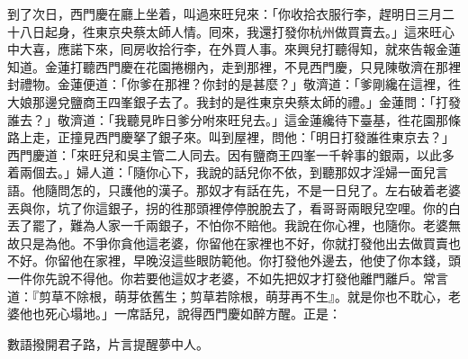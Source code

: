 到了次日，西門慶在廳上坐着，叫過來旺兒來：「你收拾衣服行李，趕明日三月二十八日起身，徃東京央蔡太師人情。囘來，我還打發你杭州做買賣去。」這來旺心中大喜，{}應諾下來，囘房收拾行李，在外買人事。來興兒打聽得知，就來告報金蓮知道。金蓮打聽西門慶在花園捲棚內，走到那裡，不見西門慶，只見陳敬濟在那裡封禮物。金蓮便道：「你爹在那裡？你封的是甚麼？」敬濟道：「爹剛纔在這裡，徃大娘那邊兌鹽商王四峯銀子去了。我封的是徃東京央蔡太師的禮。」金蓮問：「打發誰去？」敬濟道：「我聽見昨日爹分咐來旺兒去。」這金蓮纔待下臺基，徃花園那條路上走，正撞見西門慶拏了銀子來。叫到屋裡，問他：「明日打發誰徃東京去？」西門慶道：「來旺兒和吳主管二人同去。因有鹽商王四峯一千幹事的銀兩，以此多着兩個去。」婦人道：「隨你心下，我說的話兒你不依，到聽那奴才淫婦一面兒言語。他隨問怎的，只護他的漢子。那奴才有話在先，不是一日兒了。左右破着老婆丟與你，坑了你這銀子，拐的徃那頭裡停停脫脫去了，看哥哥兩眼兒空哩。你的白丟了罷了，難為人家一千兩銀子，不怕你不賠他。{}我說在你心裡，也隨你。老婆無故只是為他。不爭你貪他這老婆，你留他在家裡也不好，你就打發他出去做買賣也不好。你留他在家裡，早晚沒這些眼防範他。你打發他外邊去，他使了你本錢，頭一件你先說不得他。你若要他這奴才老婆，不如先把奴才打發他離門離戶。常言道：『剪草不除根，萌芽依舊生；剪草若除根，萌芽再不生』。就是你也不耽心，老婆他也死心塌地。」{}一席話兒，說得西門慶如醉方醒。正是：

\begin{myquote}
數語撥開君子路，片言提醒夢中人。
\end{myquote}

